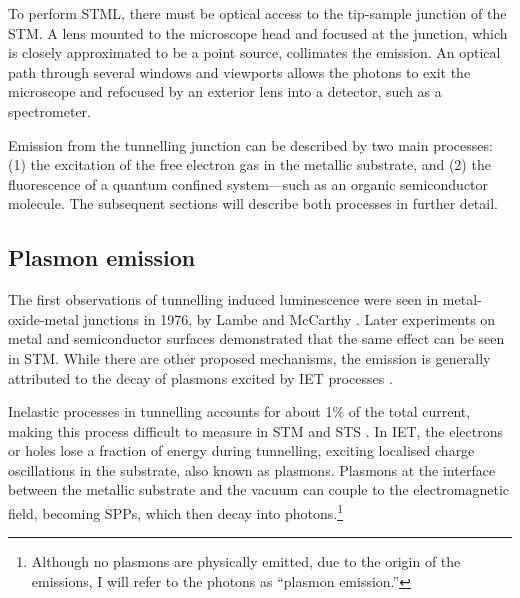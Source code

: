 To perform \ac{STML}, there must be optical access to the tip-sample junction of the \ac{STM}. A lens mounted to the microscope head and focused at the junction, which is closely approximated to be a point source, collimates the emission. An optical path through several windows and viewports allows the photons to exit the microscope and refocused by an exterior lens into a detector, such as a spectrometer. 


Emission from the tunnelling junction can be described by two main processes: (1) the excitation of the free electron gas in the metallic substrate, and (2) the fluorescence of a quantum confined system---such as an organic semiconductor molecule. The subsequent sections will describe both processes in further detail. 


\subsection{Plasmon emission}

The first observations of tunnelling induced luminescence were seen in metal-oxide-metal junctions in 1976, by Lambe and McCarthy \citep{lambe1976light}. Later experiments on metal and semiconductor surfaces demonstrated that the same effect can be seen in \ac{STM}. While there are other proposed mechanisms, the emission is generally attributed to the decay of plasmons excited by \acf{IET} processes \citep{berndt1991inelastic}.

Inelastic processes in tunnelling accounts for about 1\% of the total current, making this process difficult to measure in \ac{STM} and \ac{STS} \citep{novotny2012principles}. In \ac{IET}, the electrons or holes lose a fraction of energy during tunnelling, exciting localised charge oscillations in the substrate, also known as plasmons. Plasmons at the interface between the metallic substrate and the vacuum can couple to the electromagnetic field, becoming \acp{SPP}, which then decay into photons.\footnote{Although no plasmons are physically emitted, due to the origin of the emissions, I will refer to the photons as ``plasmon emission.''} 


